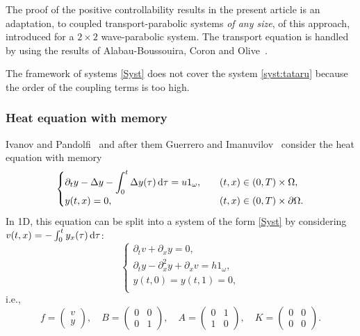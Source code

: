 \documentclass[11pt]{article}
\newcommand{\ie}{i.e.,\xspace}
\providecommand{\dpl}{\displaystyle}
\theoremstyle{plain}
\theoremstyle{definition}
\theoremstyle{remark}
\newcommand{\diff}[1][-3]{\ensuremath{\mathop{}\mkern#1mu\mathrm{d}}}
\begin{document}
The proof of the positive controllability results in the present article is an adaptation, to coupled transport-parabolic systems \emph{of any size}, of this approach, introduced for a $2\times2$ wave-parabolic system. The transport equation is handled by using the results of Alabau-Boussouira, Coron and Olive~\cite{alabau-boussouira_2017}.

The framework of systems \eqref{Syst} does not cover the system \eqref{syst:tataru} because the order of the coupling terms is too high.

\subsubsection{Heat equation with memory}
Ivanov and Pandolfi~\cite{ivanov_2009} and after them Guerrero and Imanuvilov~\cite{guerrero_2013} consider the heat equation with memory
\begin{equation} \label{chaleur_mem}
\begin{cases}
\dpl\partial_t y - \Delta y - \int_0^t \Delta y (\tau) \diff \tau = u 1_\omega, \quad & (t,x)\in(0,T)\times\Omega, \\
y(t,x)=0, & (t,x)\in(0,T)\times\partial\Omega.
\end{cases}
\end{equation}
In 1D, this equation can be split into a system of the form \eqref{Syst} by considering $v(t,x)=-\int_0^t y_x(\tau) \diff \tau$:
\begin{equation} \label{chaleur_mem_syst}
\begin{cases}
\partial_t v +\partial_x y = 0, \\
\partial_t y - \partial_x^2 y + \partial_xv = h 1_{\omega}, \\
y(t,0)=y(t,1)=0, \\
\end{cases}
\end{equation}
\ie
\[
f=\begin{pmatrix}
v \\ y
\end{pmatrix}, \quad
B=\begin{pmatrix}
0 & 0 \\ 0 & 1
\end{pmatrix}, \quad
A=\begin{pmatrix}
0 & 1 \\ 1 & 0
\end{pmatrix}, \quad
K=\begin{pmatrix}
0 & 0 \\ 0 & 0
\end{pmatrix}.
\]
\end{document}
